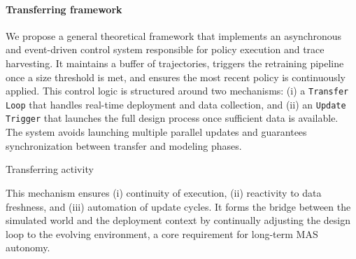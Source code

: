 \documentclass[pdflatex,sn-mathphys-num]{sn-jnl}%
\theoremstyle{thmstyleone}%
\theoremstyle{thmstyletwo}%
\theoremstyle{thmstylethree}%
\begin{document}
\paragraph{Transferring framework}
We propose a general theoretical framework that implements an asynchronous and event-driven control system responsible for policy execution and trace harvesting. It maintains a buffer of trajectories, triggers the retraining pipeline once a size threshold is met, and ensures the most recent policy is continuously applied. This control logic is structured around two mechanisms:
(i) a \texttt{Transfer Loop} that handles real-time deployment and data collection, and
(ii) an \texttt{Update Trigger} that launches the full design process once sufficient data is available. The system avoids launching multiple parallel updates and guarantees synchronization between transfer and modeling phases.

\vspace{-0.3em}
\begin{algorithm}[H]
    \caption{Transferring activity}
    \label{alg:transferring}
    \DontPrintSemicolon
    
    \vspace{0.3em}
\end{algorithm}

This mechanism ensures (i) continuity of execution, (ii) reactivity to data freshness, and (iii) automation of update cycles. It forms the bridge between the simulated world and the deployment context by continually adjusting the design loop to the evolving environment, a core requirement for long-term MAS autonomy.
\end{document}
